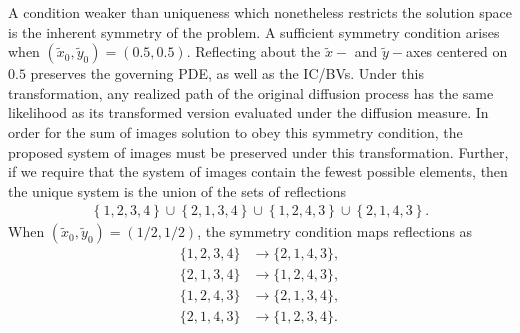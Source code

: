 A condition weaker than uniqueness which nonetheless restricts the
solution space is the inherent symmetry of the problem. A sufficient
symmetry condition arises when
$(\tilde{x}_0, \tilde{y}_0) = (0.5, 0.5)$. Reflecting about the
$\tilde{x}-$ and $\tilde{y}-$axes centered on $0.5$ preserves the
governing PDE, as well as the IC/BVs. Under this transformation, any
realized path of the original diffusion process has the same
likelihood as its transformed version evaluated under the diffusion
measure. In order for the sum of images solution to obey this symmetry
condition, the proposed system of images must be preserved under this
transformation. Further, if we require that the system of images
contain the fewest possible elements, then the unique system is the
union of the sets of reflections
\begin{align*}
  \left\{ 1,2,3,4 \right\} \cup \left\{ 2,1,3,4 \right\} \cup \left\{ 1,2,4,3 \right\} \cup \left\{ 2,1,4,3 \right\}.
\end{align*}
When $(\tilde{x}_0, \tilde{y}_0) = (1/2,1/2)$, the symmetry condition
maps reflections as
\begin{align*}
  \{1,2,3,4 \} & \to \{2,1,4,3 \}, \\
  \{2,1,3,4 \} &\to \{1,2,4,3 \}, \\
  \{1,2,4,3 \} &\to \{2,1,3,4 \}, \\
  \{2,1,4,3 \} &\to \{1,2,3,4 \}.
\end{align*}


